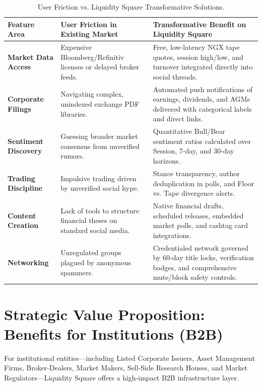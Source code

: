 \documentclass[11pt,a4paper]{article}
\begin{document}
\begin{table}[h!]
\centering
\small
\begin{tabularx}{\textwidth}{l p{4.5cm} X}
\toprule
\textbf{Feature Area} & \textbf{User Friction in Existing Market} & \textbf{Transformative Benefit on Liquidity Square} \\
\midrule
\textbf{Market Data Access} & Expensive Bloomberg/Refinitiv licenses or delayed broker feeds. & Free, low-latency NGX tape quotes, session high/low, and turnover integrated directly into social threads. \\
\addlinespace
\textbf{Corporate Filings} & Navigating complex, unindexed exchange PDF libraries. & Automated push notifications of earnings, dividends, and AGMs delivered with categorical labels and direct links. \\
\addlinespace
\textbf{Sentiment Discovery} & Guessing broader market consensus from unverified rumors. & Quantitative Bull/Bear sentiment ratios calculated over Session, 7-day, and 30-day horizons. \\
\addlinespace
\textbf{Trading Discipline} & Impulsive trading driven by unverified social hype. & Stance transparency, author deduplication in polls, and Floor vs. Tape divergence alerts. \\
\addlinespace
\textbf{Content Creation} & Lack of tools to structure financial theses on standard social media. & Native financial drafts, scheduled releases, embedded market polls, and cashtag card integrations. \\
\addlinespace
\textbf{Networking} & Unregulated groups plagued by anonymous spammers. & Credentialed network governed by 60-day title locks, verification badges, and comprehensive mute/block safety controls. \\
\bottomrule
\end{tabularx}
\caption{User Friction vs. Liquidity Square Transformative Solutions.}
\end{table}

\section{Strategic Value Proposition: Benefits for Institutions (B2B)}

For institutional entities---including Listed Corporate Issuers, Asset Management Firms, Broker-Dealers, Market Makers, Sell-Side Research Houses, and Market Regulators---Liquidity Square offers a high-impact B2B infrastructure layer.
\end{document}
